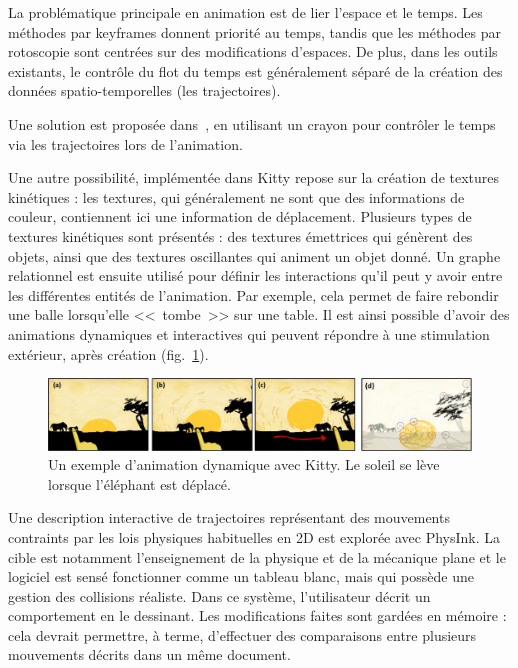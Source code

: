 \documentclass[french,12pt]{article}
\begin{document}
La problématique principale en animation est de lier l'espace et le temps. Les méthodes par keyframes donnent priorité au temps, tandis que les méthodes par rotoscopie sont centrées sur des modifications d'espaces. De plus, dans les outils existants, le contrôle du flot du temps est généralement séparé de la création des données spatio-temporelles (les trajectoires). 

Une solution est proposée dans~\cite{santosa_direct_2013}, en utilisant un crayon pour contrôler le temps via les trajectoires lors de l'animation.

Une autre possibilité, implémentée dans Kitty\cite{kazi_kitty:_2014} repose sur la création de textures kinétiques : les textures, qui généralement ne sont que des informations de couleur, contiennent ici une information de déplacement. Plusieurs types de textures kinétiques sont présentés : des textures émettrices qui génèrent des objets, ainsi que des textures oscillantes qui animent un objet donné. Un graphe relationnel est ensuite utilisé pour définir les interactions qu'il peut y avoir entre les différentes entités de l'animation. Par exemple, cela permet de faire rebondir une balle lorsqu'elle <<~tombe~>> sur une table. Il est ainsi possible d'avoir des animations dynamiques et interactives qui peuvent répondre à une stimulation extérieur, après création (fig.~\ref{fig.kitty}).

\begin{figure}[h]
    \centering
    \includegraphics[scale=0.42]{images/kitty.png}
    \caption{Un exemple d'animation dynamique avec Kitty. Le soleil se lève lorsque l'éléphant est déplacé.}
    \label{fig.kitty}
\end{figure}

Une description interactive de trajectoires représentant des mouvements contraints par les lois physiques habituelles en 2D est explorée avec PhysInk\cite{scott_physink:_2013}. 
La cible est notamment l'enseignement de la physique et de la mécanique plane et le logiciel est sensé fonctionner comme un tableau blanc, mais qui possède une gestion des collisions réaliste. 
Dans ce système, l'utilisateur décrit un comportement en le dessinant.
 Les modifications faites sont gardées en mémoire : cela devrait permettre, à terme, d'effectuer des comparaisons entre plusieurs mouvements décrits dans un même document.
\end{document}
